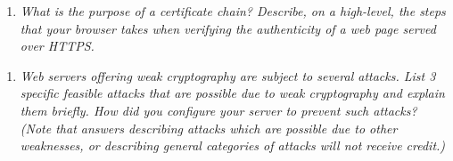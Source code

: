 
\begin{enumerate}[resume]
    \item \itshape  What is the purpose of a certificate chain? Describe, on a high-level, the steps that your
          browser takes when verifying the authenticity of a web page served over \textnormal{HTTPS}.
\end{enumerate}




\begin{enumerate}[resume]
    \item \itshape Web servers offering weak cryptography are subject to several attacks. List 3 specific
          feasible attacks that are possible due to weak cryptography and explain them briefly. How
          did you configure your server to prevent such attacks? (Note that answers describing attacks
          which are possible due to other weaknesses, or describing general categories of attacks will not
          receive credit.)
\end{enumerate}



